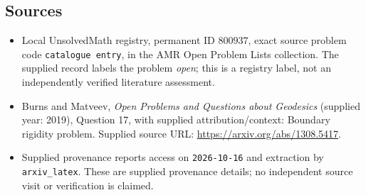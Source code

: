 \documentclass[11pt]{article}
\begin{document}
\subsection{Sources}
\begin{itemize}
\item Local UnsolvedMath registry, permanent ID \(800937\), exact source problem code \texttt{catalogue entry}, in the AMR Open Problem Lists collection. The supplied record labels the problem \emph{open}; this is a registry label, not an independently verified literature assessment.
\item Burns and Matveev, \emph{Open Problems and Questions about Geodesics} (supplied year: 2019), Question 17, with supplied attribution/context: Boundary rigidity problem. Supplied source URL: \url{https://arxiv.org/abs/1308.5417}.
\item Supplied provenance reports access on \texttt{2026-10-16} and extraction by \texttt{arxiv\_latex}. These are supplied provenance details; no independent source visit or verification is claimed.
\end{itemize}
\end{document}
